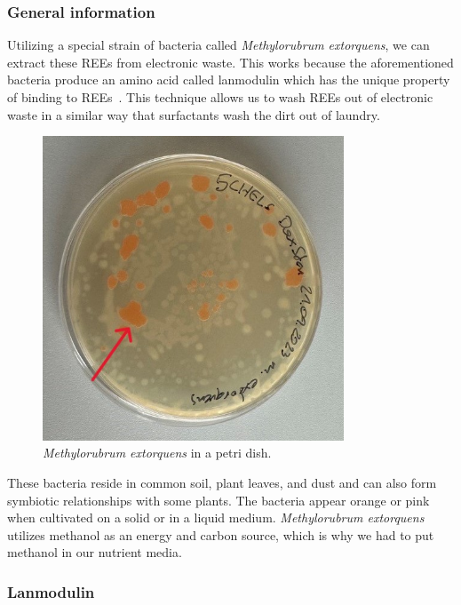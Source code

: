\subsubsection{General information\authorB{}}

Utilizing a special strain of bacteria called \emph{Methylorubrum extorquens}, we can extract these REEs from electronic waste.
This works because the aforementioned bacteria produce an amino acid called lanmodulin which has the unique property of binding to REEs~\cite{lanmdiscovery}.
This technique allows us to wash REEs out of electronic waste in a similar way that
surfactants wash the dirt out of laundry.

\begin{figure}[H]
    \centering
    \includegraphics[width=0.8\textwidth]{./media/images/mextorquens_petri_dish}
    \caption{\emph{Methylorubrum extorquens} in a petri dish.}
    \label{fig:mextorquens_petri_dish}
\end{figure}

These bacteria reside in common soil, plant leaves, and dust and can also form symbiotic
relationships with some plants.
The bacteria appear orange or pink when cultivated on a solid or in a liquid medium.
\emph{Methylorubrum extorquens} utilizes methanol as an energy
and carbon source, which is why we had to put methanol in our nutrient media.

\subsubsection{Lanmodulin\authorA}

